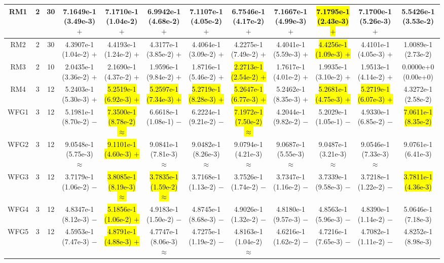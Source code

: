 \documentclass[journal]{IEEEtran}
\begin{document}
\begin{table*}[htbp]
\begin{tabular}{cccccccccccc}
\hline
\multirow{1}{*}{RM1}&2&30&7.1649e-1 (3.49e-3) $+$&7.1710e-1 (1.04e-2) $+$&6.9942e-1 (4.68e-2) $+$&7.1107e-1 (4.05e-2) $+$&6.7546e-1 (4.17e-2) $+$&7.1667e-1 (4.99e-3) $+$&\hl{7.1795e-1 (2.43e-3) $+$}&7.1700e-1 (5.26e-3) $+$&5.5426e-1 (3.53e-2)\\
\hline
\multirow{1}{*}{RM2}&2&30&4.3907e-1 (1.04e-2) $+$&4.4193e-1 (1.24e-2) $+$&4.3177e-1 (3.85e-2) $+$&4.4064e-1 (3.09e-2) $+$&4.2275e-1 (7.49e-2) $+$&4.4041e-1 (5.59e-3) $+$&\hl{4.4256e-1 (1.09e-3) $+$}&4.4101e-1 (4.05e-3) $+$&1.0089e-1 (2.73e-2)\\
\hline
\multirow{1}{*}{RM3}&2&10&2.0435e-1 (3.36e-2) $+$&2.1690e-1 (4.37e-2) $+$&1.9596e-1 (9.84e-2) $+$&1.8716e-1 (5.46e-2) $+$&\hl{2.2713e-1 (2.54e-2) $+$}&1.7617e-1 (4.01e-2) $+$&1.9935e-1 (3.10e-2) $+$&1.9513e-1 (4.14e-2) $+$&0.0000e+0 (0.00e+0)\\
\hline
\multirow{1}{*}{RM4}&3&12&5.2403e-1 (5.30e-3) $+$&\hl{5.2519e-1 (6.92e-3) $+$}&\hl{5.2597e-1 (7.34e-3) $+$}&\hl{5.2719e-1 (8.28e-3) $+$}&\hl{5.2647e-1 (6.77e-3) $+$}&5.2462e-1 (8.35e-3) $+$&\hl{5.2681e-1 (4.75e-3) $+$}&\hl{5.2719e-1 (6.07e-3) $+$}&4.3272e-1 (2.58e-2)\\
\hline
\multirow{1}{*}{WFG1}&3&12&5.1981e-1 (8.70e-2) $-$&\hl{7.3500e-1 (8.78e-2) $\approx$}&6.6618e-1 (1.08e-1) $-$&6.2224e-1 (9.21e-2) $-$&\hl{7.1972e-1 (7.50e-2) $\approx$}&4.2044e-1 (9.82e-2) $-$&5.2029e-1 (1.05e-1) $-$&4.9330e-1 (6.85e-2) $-$&\hl{7.0611e-1 (8.35e-2)}\\
\hline
\multirow{1}{*}{WFG2}&3&12&9.0548e-1 (5.75e-3) $\approx$&\hl{9.1101e-1 (4.60e-3) $+$}&9.0841e-1 (7.81e-3) $\approx$&9.0482e-1 (8.26e-3) $\approx$&9.0794e-1 (4.21e-3) $\approx$&9.0687e-1 (5.55e-3) $\approx$&9.0487e-1 (3.21e-3) $\approx$&9.0546e-1 (7.33e-3) $\approx$&9.0761e-1 (6.41e-3)\\
\hline
\multirow{1}{*}{WFG3}&3&12&3.7179e-1 (1.06e-2) $-$&\hl{3.8085e-1 (8.19e-3) $\approx$}&\hl{3.7835e-1 (1.59e-2) $\approx$}&3.7168e-1 (1.13e-2) $-$&3.7526e-1 (1.74e-2) $-$&3.7347e-1 (1.16e-2) $-$&3.7339e-1 (9.58e-3) $-$&3.7218e-1 (1.22e-2) $-$&\hl{3.7811e-1 (4.36e-3)}\\
\hline
\multirow{1}{*}{WFG4}&3&12&4.8347e-1 (8.12e-3) $-$&\hl{5.1856e-1 (1.06e-2) $+$}&4.9183e-1 (1.50e-2) $-$&4.8745e-1 (8.68e-3) $-$&4.9026e-1 (1.32e-2) $-$&4.8180e-1 (9.57e-3) $-$&4.8563e-1 (5.96e-3) $-$&4.8390e-1 (1.14e-2) $-$&5.0646e-1 (7.18e-3)\\
\hline
\multirow{1}{*}{WFG5}&3&12&4.5953e-1 (7.47e-3) $-$&\hl{4.8791e-1 (4.88e-3) $+$}&4.7747e-1 (8.06e-3) $\approx$&4.7275e-1 (1.19e-2) $-$&4.8163e-1 (1.04e-2) $\approx$&4.6216e-1 (1.62e-2) $-$&4.7216e-1 (7.65e-3) $-$&4.7082e-1 (1.11e-2) $-$&4.8252e-1 (8.98e-3)\\

\end{tabular}
\end{table*}
\end{document}
